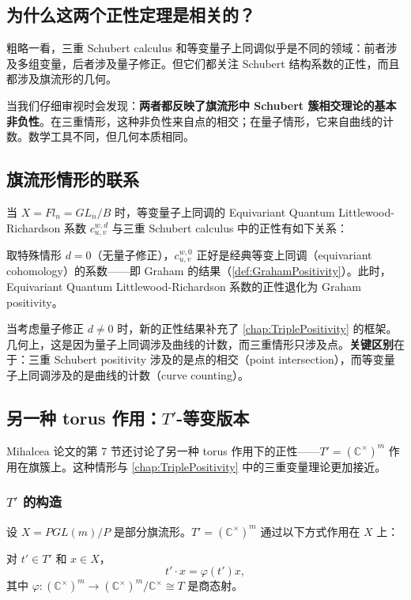 \subsection{为什么这两个正性定理是相关的？}

粗略一看，三重 Schubert calculus 和等变量子上同调似乎是不同的领域：前者涉及多组变量，后者涉及量子修正。但它们都关注 Schubert 结构系数的正性，而且都涉及旗流形的几何。

当我们仔细审视时会发现：\textbf{两者都反映了旗流形中 Schubert 簇相交理论的基本非负性}。在三重情形，这种非负性来自点的相交；在量子情形，它来自曲线的计数。数学工具不同，但几何本质相同。

\subsection{旗流形情形的联系}

当 $X = Fl_n = GL_n/B$ 时，等变量子上同调的 Equivariant Quantum Littlewood-Richardson 系数 $c_{u,v}^{w,d}$ 与三重 Schubert calculus 中的正性有如下关系：

取特殊情形 $d = 0$（无量子修正），$c_{u,v}^{w,0}$ 正好是经典等变上同调（equivariant cohomology）的系数——即 Graham 的结果（\cref{def:GrahamPositivity}）。此时，Equivariant Quantum Littlewood-Richardson 系数的正性退化为 Graham positivity。

当考虑量子修正 $d \neq 0$ 时，新的正性结果补充了 \cref{chap:TriplePositivity} 的框架。几何上，这是因为量子上同调涉及曲线的计数，而三重情形只涉及点。\textbf{关键区别}在于：三重 Schubert positivity 涉及的是点的相交（point intersection），而等变量子上同调涉及的是曲线的计数（curve counting）。

\subsection{另一种 torus 作用：$T'$-等变版本}

Mihalcea 论文的第 7 节还讨论了另一种 torus 作用下的正性——$T' = (\mathbb{C}^\times)^m$ 作用在旗簇上。这种情形与 \cref{chap:TriplePositivity} 中的三重变量理论更加接近。

\subsubsection{$T'$ 的构造}

设 $X = PGL(m)/P$ 是部分旗流形。$T' = (\mathbb{C}^\times)^m$ 通过以下方式作用在 $X$ 上：

对 $t' \in T'$ 和 $x \in X$，
$$t' \cdot x = \varphi(t') x,$$
其中 $\varphi: (\mathbb{C}^\times)^m \to (\mathbb{C}^\times)^m / \mathbb{C}^\times \cong T$ 是商态射。

